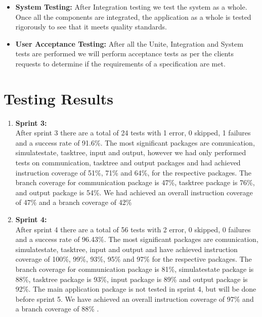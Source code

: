 \begin{enumerate}
\begin{itemize}
\begin{itemize}
\end{itemize}

\item \textbf{System Testing:} After Integration testing we test the system as a whole. Once all the components are integrated, the application as a whole is tested rigorously to see that it meets quality standards.

\item \textbf{User Acceptance Testing:} After all the Unite, Integration and System tests are performed we will perform acceptance tests as per the clients requests to determine if the requirements of a specification are met.
\end{itemize}

\end{enumerate}

\section{Testing Results}

\begin{enumerate}

\item \textbf{Sprint 3:} \\

After sprint 3 there are a total of  24  tests with 1 error, 0 skipped, 1 failures and a success rate of 91.6\%. The most significant packages are comunication, simulatestate, tasktree, input and output, however we had only performed tests on communication, tasktree and output packages and had achieved instruction coverage of  51\%, 71\% and 64\%,  for the respective packages. The branch coverage for communication package is 47\%, tasktree package is 76\%, and output package is 54\%.  We had achieved an overall instruction coverage of 47\% and a branch coverage of 42\%

\item \textbf{Sprint 4:} \\

After sprint 4 there are a total of 56 tests with 2 error, 0 skipped, 0 failures and a success rate of 96.43\%. The most significant packages are comunication, simulatestate, tasktree, input and output and have achieved instruction coverage of  100\%, 99\%, 93\%, 95\% and 97\%  for the respective packages. The branch coverage for communication package is 81\%, simulatestate package is 88\%, tasktree package is 93\%, input package is 89\% and output package is 92\%. The main application package is not tested in  sprint 4, but will be done before sprint 5. We have achieved an overall instruction coverage of 97\% and a branch coverage of 88\% .

\end{enumerate}